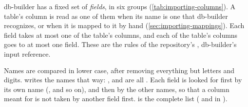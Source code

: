 db-builder has a fixed set of \emph{fields}, in six groups (\cref{tab:importing-columns}). A
table's column is read as one of them when its name is one that db-builder recognizes, or when it
is mapped to it by hand (\cref{sec:importing-mappings}). Each field takes at most one of the
table's columns, and each of the table's columns goes to at most one field. These are the rules
of the repository's , db-builder's input reference.

Names are compared in lower case, after removing everything but letters and digits.
 writes the names that way: ,  and
 are all . Each field is looked for first by its own name
(,  and so on), and then by the other names, so that a column
 meant for  is not taken by another field first.
 is the complete list ( and  in
).

